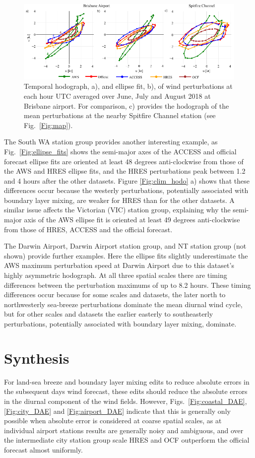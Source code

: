 \documentclass{ametsoc}
\begin{document}
\begin{figure}
\centering
\includegraphics[width=39pc]{ellipse_hodo.pdf}
\caption{Temporal hodograph, a), and ellipse fit, b), of wind perturbations at each hour UTC averaged over June, July and August 2018 at Brisbane airport. For comparison, c) provides the hodograph of the mean perturbations at the nearby Spitfire Channel station (see Fig.~\ref{Fig:map}).}
\label{Fig:ellipse_hodo}
\end{figure}

The South WA station group provides another interesting example, as Fig.~\ref{Fig:ellipse_fits} shows the semi-major axes of the ACCESS and official forecast ellipse fits are oriented at least 48 degrees anti-clockwise from those of the AWS and HRES ellipse fits, and the HRES perturbations peak between 1.2 and 4 hours after the other datasets. Figure \ref{Fig:clim_hodo} a) shows that these differences occur because the westerly perturbations, potentially associated with boundary layer mixing, are weaker for HRES than for the other datasets. A similar issue affects the Victorian (VIC) station group, explaining why the semi-major axis of the AWS ellipse fit is oriented at least 49 degrees anti-clockwise from those of HRES, ACCESS and the official forecast. 

The Darwin Airport, Darwin Airport station group, and NT station group (not shown) provide further examples. Here the ellipse fits slightly underestimate the AWS maximum perturbation speed at Darwin Airport due to this dataset's highly asymmetric hodograph. At all three spatial scales there are timing differences between the perturbation maximums of up to 8.2 hours. These timing differences occur because for some scales and datasets, the later north to northwesterly sea-breeze perturbations dominate the mean diurnal wind cycle, but for other scales and datasets the earlier easterly to southeasterly perturbations, potentially associated with boundary layer mixing, dominate.

\section{Synthesis}
\label{Sec:Discussion}
For land-sea breeze and boundary layer mixing edits to reduce absolute errors in the subsequent days wind forecast, these edits should reduce the absolute errors in the diurnal component of the wind fields. However, Figs.~\ref{Fig:coastal_DAE},\ref{Fig:city_DAE} and \ref{Fig:airport_DAE} indicate that this is generally only possible when absolute error is considered at coarse spatial scales, as at individual airport stations results are generally noisy and ambiguous, and over the intermediate city station group scale HRES and OCF outperform the official forecast almost uniformly.
\end{document}
